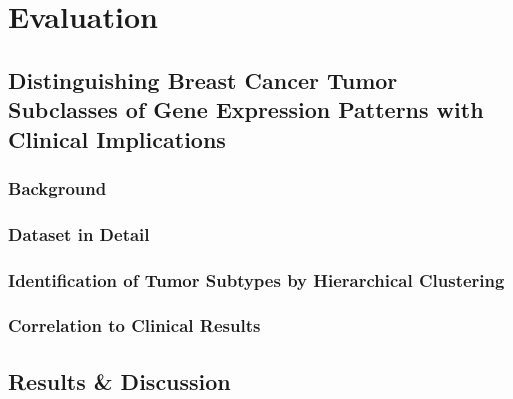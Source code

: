 %

\chapter{Evaluation}
\section{Distinguishing Breast Cancer Tumor Subclasses of Gene Expression Patterns with Clinical Implications}
\label{evaluation.usecase}
\subsection{Background}
\subsection{Dataset in Detail}
\label{evaluation.dataset}
\subsection{Identification of Tumor Subtypes by Hierarchical Clustering}
\label{evaluation.identification}
\subsection{Correlation to Clinical Results}
\label{evaluation.clinicalresults}
\section{Results \& Discussion}
\label{evaluation.results}